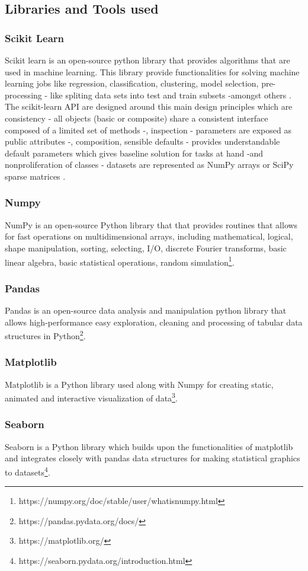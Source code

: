 \documentclass[conference]{IEEEtran}
\begin{document}
\subsection{Libraries and Tools used}
\subsubsection{Scikit Learn}
Scikit learn is an open-source python library that provides algorithms that are used in machine learning. This library provide functionalities for solving machine learning jobs like 
regression, classification, clustering, model selection, pre-processing - like spliting data sets into test and train subsets -amongst others \cite{scikit_learn}. The scikit-learn API are designed around this main design principles which are consistency - all objects (basic or composite) share a consistent interface composed of a limited set of methods -, inspection - parameters are exposed as public attributes -, composition, sensible defaults - provides understandable default parameters which gives baseline solution for tasks at hand -and nonproliferation of classes - datasets are represented as NumPy arrays or SciPy sparse matrices \cite{sklearn_api}.
\subsubsection{Numpy}
NumPy is an open-source Python library that that provides routines that allows for fast operations on multidimensional arrays, including mathematical, logical, shape manipulation, sorting, selecting, I/O, discrete Fourier transforms, basic linear algebra, basic statistical operations, random simulation\footnote{https://numpy.org/doc/stable/user/whatisnumpy.html}.
\subsubsection{Pandas}
Pandas is an open-source data analysis and manipulation python library that allows high-performance easy exploration, cleaning and processing of tabular data structures in Python\footnote{https://pandas.pydata.org/docs/}.
\subsubsection{Matplotlib}
Matplotlib is a Python library used along with Numpy for creating static, animated and interactive visualization of data\footnote{https://matplotlib.org/}.
\subsubsection{Seaborn}
Seaborn is a Python library which builds upon the functionalities of matplotlib and integrates closely with pandas data structures for making statistical graphics to datasets\footnote{https://seaborn.pydata.org/introduction.html}.
\end{document}
